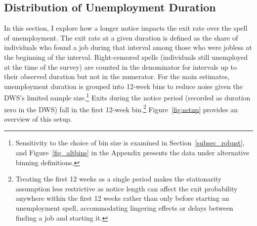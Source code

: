 \documentclass{div}
\begin{document}

\subsection{Distribution of Unemployment Duration}\label{subsec_dur_dist}

In this section, I explore how a longer notice impacts the exit rate over the spell of unemployment. The exit rate at a given duration is defined as the share of individuals who found a job during that interval among those who were jobless at the beginning of the interval. Right-censored spells (individuals still unemployed at the time of the survey) are counted in the denominator for intervals up to their observed duration but not in the numerator. For the main estimates, unemployment duration is grouped into 12-week bins to reduce noise given the DWS's limited sample size.\footnote{Sensitivity to the choice of bin size is examined in Section~\ref{subsec_robust}, and Figure~\ref{fig_altbins} in the Appendix presents the data under alternative binning definitions.} Exits during the notice period (recorded as duration zero in the DWS) fall in the first 12-week bin.\footnote{Treating the first 12 weeks as a single period makes the stationarity assumption less restrictive as notice length can affect the exit probability anywhere within the first 12 weeks rather than only before starting an unemployment spell, accommodating lingering effects or delays between finding a job and starting it.} Figure~\ref{fig:setup} provides an overview of this setup.
\end{document}
